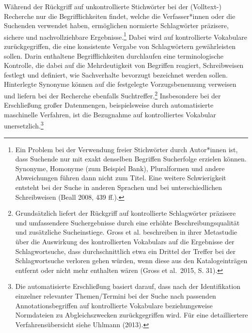 \documentclass[a4paper,
fontsize=11pt,
oneside,
numbers=noperiodatend,
parskip=half-,
bibliography=totoc,
final
]{scrartcl}
\begin{document}
Während der Rückgriff auf unkontrollierte Stichwörter bei der
(Volltext-) Recherche nur die Begrifflichkeiten findet, welche die
Verfasser*innen oder die Suchenden verwendet haben, ermöglichen
normierte Schlagwörter präzisere, sichere und nachvollziehbare
Ergebnisse.\footnote{Ein Problem bei der Verwendung freier Stichwörter
  durch Autor*innen ist, dass Suchende nur mit exakt denselben Begriffen
  Sucherfolge erzielen können. Synonyme, Homonyme (zum Beispiel Bank),
  Pluralformen und andere Abweichungen führen dann nicht zum Titel. Eine
  weitere Schwierigkeit entsteht bei der Suche in anderen Sprachen und
  bei unterschiedlichen Schreibweisen (Beall 2008, 439 ff.).} Dabei wird
auf kontrollierte Vokabulare zurückgegriffen, die eine konsistente
Vergabe von Schlagwörtern gewährleisten sollen. Darin enthaltene
Begrifflichkeiten durchlaufen eine terminologische Kontrolle, die dabei
auf die Mehrdeutigkeit von Begriffen reagiert, Schreibweisen festlegt
und definiert, wie Sachverhalte bevorzugt bezeichnet werden sollen.
Hinterlegte Synonyme können auf die festgelegte Vorzugsbenennung
verweisen und liefern bei der Recherche ebenfalls
Suchtreffer.\footnote{Grundsätzlich liefert der Rückgriff auf
  kontrollierte Schlagwörter präzisere und umfassendere Suchergebnisse
  durch eine erhöhte Beschreibungsqualität und zusätzliche
  Sucheinstiege. Gross et al. beschreiben in ihrer Metastudie über die
  Auswirkung des kontrollierten Vokabulars auf die Ergebnisse der
  Schlagwortsuche, dass durchschnittlich etwa ein Drittel der Treffer
  bei der Schlagwortsuche verloren gehen würden, wenn diese aus den
  Katalogeinträgen entfernt oder nicht mehr enthalten wären (Gross et
  al.~2015, S. 31).} Insbesondere bei der Erschließung großer
Datenmengen, beispielsweise durch automatisierte maschinelle Verfahren,
ist die Bezugnahme auf kontrolliertes Vokabular unersetzlich.\footnote{Die
  automatisierte Erschließung basiert darauf, dass nach der
  Identifikation einzelner relevanter Themen/Termini bei der Suche nach
  passenden Annotationsbegriffen auf kontrollierte Vokabulare
  beziehungsweise Normdateien zu Abgleichszwecken zurückgegriffen wird.
  Für eine detailliertere Verfahrensübersicht siehe Uhlmann (2013).}
\end{document}
